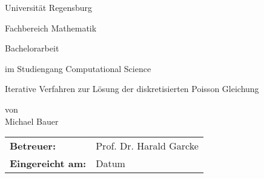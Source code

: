 
\pagestyle{empty}

\clearscrheadings\clearscrplain

\begin{center}
\begin{Huge}
Universität Regensburg\\
\vspace{3mm}
\end{Huge}{\Large Fachbereich Mathematik}\\


\vspace{15mm}
\begin{Large}
Bachelorarbeit
\end{Large}

\vspace{5mm}
\begin{large}
im Studiengang Computational Science	
\end{large}

\vspace{15mm}
\begin{Large}
Iterative Verfahren zur Lösung der diskretisierten Poisson Gleichung
\end{Large}
von\\
Michael Bauer

\vspace{8cm}
\begin{tabular}{ll}
{\bf Betreuer:} &Prof. Dr. Harald Garcke\\
{\bf Eingereicht am:} &Datum\\
\end{tabular}

\end{center}
\clearpage


\pagestyle{useheadings} %

\tableofcontents





